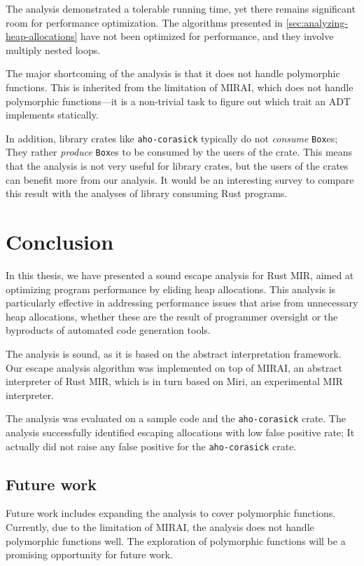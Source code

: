 \documentclass[en]{snu-ece-bsc-thesis}
\theoremstyle{definition}
\begin{document}
The analysis demonstrated a tolerable running time, yet there remains significant room for performance optimization.
The algorithms presented in \autoref{sec:analyzing-heap-allocations} have not been optimized for performance, and they involve multiply nested loops.

The major shortcoming of the analysis is that it does not handle polymorphic functions.
This is inherited from the limitation of MIRAI, which does not handle polymorphic functions---it is a non-trivial task to figure out which trait an ADT implements statically.

In addition, library crates like \verb/aho-corasick/ typically do not \emph{consume} \verb/Box/es;
They rather \emph{produce} \verb/Box/es to be consumed by the users of the crate.
This means that the analysis is not very useful for library crates, but the users of the crates can benefit more from our analysis.
It would be an interesting survey to compare this result with the analyses of library consuming Rust programs.


\chapter{Conclusion}\label{chap:conclusion}
In this thesis, we have presented a sound escape analysis for Rust MIR, aimed at optimizing program performance by eliding heap allocations.
This analysis is particularly effective in addressing performance issues that arise from unnecessary heap allocations, whether these are the result of programmer oversight or the byproducts of automated code generation tools.

The analysis is sound, as it is based on the abstract interpretation framework.
Our escape analysis algorithm was implemented on top of MIRAI, an abstract interpreter of Rust MIR, which is in turn based on Miri, an experimental MIR interpreter.

The analysis was evaluated on a sample code and the \verb/aho-corasick/ crate.
The analysis successfully identified escaping allocations with low false positive rate; It actually did not raise any false positive for the \verb/aho-corasick/ crate.

\section{Future work}
Future work includes expanding the analysis to cover polymorphic functions.
Currently, due to the limitation of MIRAI, the analysis does not handle polymorphic functions well.
The exploration of polymorphic functions will be a promising opportunity for future work.
\end{document}
